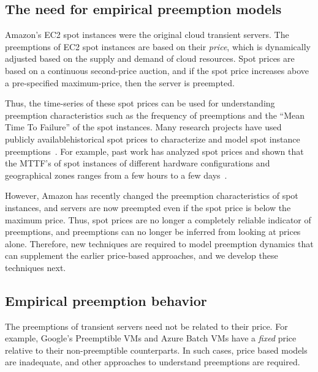 \subsection{The need for empirical preemption models}

Amazon's EC2 spot instances were the original cloud transient servers.
The preemptions of EC2 spot instances are based on their \emph{price}, which is dynamically adjusted based on the supply and demand of cloud resources.
Spot prices are based on a continuous second-price auction, and if the spot price increases above a pre-specified maximum-price, then the server is preempted.

Thus, the time-series of these spot prices can be used for understanding preemption characteristics such as the frequency of preemptions and the ``Mean Time To Failure'' of the spot instances.
Many research projects have used publicly available\footnotemark historical spot prices to characterize and model spot instance preemptions~\cite{spotcheck,how-to-bid}. %
For example, past work has analyzed spot prices and shown that the MTTF's of spot instances of different hardware configurations and geographical zones ranges from a few hours to a few days~\cite{prateek-thesis, shastri-thesis}. 



However, Amazon has recently changed the preemption characteristics of spot instances, and servers are now preempted even if the spot price is below the maximum price.
Thus, spot prices are no longer a completely reliable indicator of preemptions, and preemptions can no longer be inferred from looking at prices alone.
Therefore, new techniques are required to model preemption dynamics that can supplement the earlier price-based approaches, and we develop these techniques next.


\subsection{Empirical preemption behavior}

The preemptions of transient servers need not be related to their price.
For example, Google's Preemptible VMs and Azure Batch VMs have a \emph{fixed} price relative to their non-preemptible counterparts. 
In such cases, price based models are inadequate, and other approaches to understand preemptions are required.

